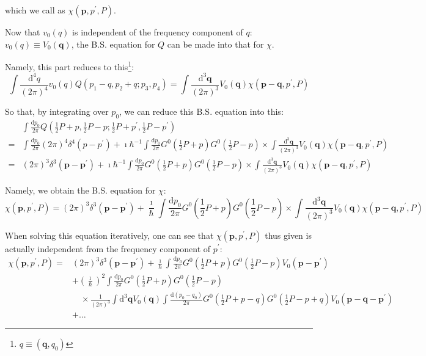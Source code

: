 which we call as $\chi(\mathbf{p},p^{'},P)$.

Now that $v_0(q)$ is independent of the frequency component of $q$: $v_0(q) \equiv V_0(\mathbf{q})$, the B.S. equation for $Q$ can be made into that for $\chi$.

Namely, this part reduces to this\footnote{$q \equiv (\mathbf{q},q_0)$}:
\[ \int \frac{\mathrm{d}^4 q}{(2\pi)^4} v_0(q) Q(p_1-q,p_2+q;p_3,p_4) = \int \frac{\mathrm{d}^3 \mathbf{q}}{(2\pi)^3} V_0(\mathbf{q}) \chi(\mathbf{p}-\mathbf{q}, p^{'}, P) \]

So that, by integrating over $p_0$, we can reduce this B.S. equation into this:
\[ \begin{split}
&\int \frac{\mathrm{d}p_0}{2\pi} Q(\frac{1}{2}P+p,\frac{1}{2}P-p;\frac{1}{2}P+p^{'},\frac{1}{2}P-p^{'})\\
= &\int \frac{\mathrm{d}p_0}{2\pi} (2\pi)^4 \delta^4(p-p^{'}) + \imath \hbar^{-1} \int \frac{\mathrm{d}p_0}{2\pi} G^0(\frac{1}{2}P+p)G^0(\frac{1}{2}P-p) \times \int \frac{\mathrm{d}^3\mathbf{q}}{(2\pi)^3} V_0(\mathbf{q})\chi(\mathbf{p}-\mathbf{q},p^{'},P)\\
=&(2\pi)^3 \delta^3(\mathbf{p}-\mathbf{p}^{'}) + \imath \hbar^{-1} \int \frac{\mathrm{d}p_0}{2\pi} G^0(\frac{1}{2}P+p)G^0(\frac{1}{2}P-p) \times \int \frac{\mathrm{d}^3\mathbf{q}}{(2\pi)^3} V_0(\mathbf{q})\chi(\mathbf{p}-\mathbf{q},p^{'},P)
\end{split} \]

Namely, we obtain the B.S. equation for $\chi$:
\begin{equation} \label{Eqs2.7.13}
\chi(\mathbf{p},p^{'},P) = (2\pi)^3 \delta^3(\mathbf{p}-\mathbf{p}^{'}) + \frac{\imath}{\hbar} \int \frac{\mathrm{d}p_0}{2\pi} G^0(\frac{1}{2}P+p)G^0(\frac{1}{2}P-p)\times\int\frac{\mathrm{d}^3 \mathbf{q}}{(2\pi)^3}V_0(\mathbf{q}) \chi(\mathbf{p}-\mathbf{q},p^{'},P)
\end{equation}

When solving this equation iteratively, one can see that $\chi(\mathbf{p},p^{'},P)$ thus given is actually independent from the frequency component of $p^{'}$:
\[ \begin{split} \chi(\mathbf{p},p^{'},P) =& (2\pi)^3\delta^3(\mathbf{p}-\mathbf{p}^{'})+\frac{\imath}{\hbar} \int \frac{\mathrm{d}p_0}{2\pi}G^0(\frac{1}{2}P+p)G^0(\frac{1}{2}P-p)V_0(\mathbf{p}-\mathbf{p}^{'})\\
&+\left(\frac{\imath}{\hbar}\right)^2 \int \frac{\mathrm{d}p_0}{2\pi}G^0(\frac{1}{2}P+p)G^0(\frac{1}{2}P-p) \\
&\quad \times \frac{1}{(2\pi)^3} \int \mathrm{d}^3\mathbf{q}V_0(\mathbf{q}) \int \frac{\mathrm{d}(p_0-q_0)}{2\pi}G^0(\frac{1}{2}P+p-q)G^0(\frac{1}{2}P-p+q)V_0(\mathbf{p}-\mathbf{q}-\mathbf{p}^{'})\\
&+ \ldots
\end{split} \]

